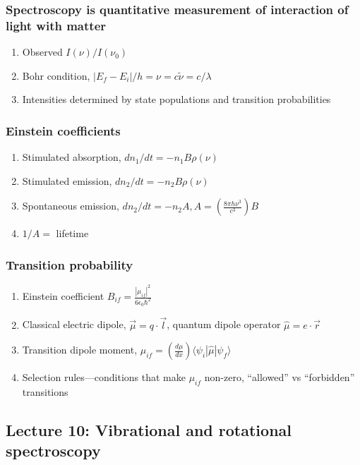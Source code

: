 \documentclass[11pt]{article}
\begin{document}
\subsubsection{Spectroscopy is quantitative measurement of interaction of light with matter}
\label{sec:orga897ceb}
\begin{enumerate}
\item Observed \(I(\nu)/I(\nu_0)\)
\item Bohr condition, \(|E_f-E_i|/h=\nu =c\tilde{\nu}=c/\lambda\)
\item Intensities determined by state populations and transition probabilities
\end{enumerate}
\subsubsection{Einstein coefficients}
\label{sec:org3b58613}
\begin{enumerate}
\item Stimulated absorption, \(dn_1/dt= -n_1 B\rho(\nu)\)
\item Stimulated emission, \(dn_2/dt= -n_2 B\rho(\nu)\)
\item Spontaneous emission, \(dn_2/dt=-n_2 A, A=\left ( \frac{8\pi h
              \nu^3}{c^3}\right )B\)
\item \(1/A=\) lifetime
\end{enumerate}
\subsubsection{Transition probability}
\label{sec:org8d603f5}
\begin{enumerate}
\item Einstein coefficient \(B_{if}=\frac{|\mu_{if}|^2}{6\epsilon_0\hbar^2}\)
\item Classical electric dipole, \(\overrightarrow{\mu}=q \cdot
          \overrightarrow{l}\), quantum dipole operator \(\hat\mu = e\cdot \overrightarrow{r}\)
\item Transition dipole moment, \(\mu_{if} = \left(
        \frac{d\mu}{dx}\right ) \langle \psi_i|\hat\mu |\psi_f \rangle\)
\item Selection rules---conditions that make \(\mu_{if}\) non-zero,
``allowed'' vs ``forbidden'' transitions
\end{enumerate}
\subsection{Lecture 10: Vibrational and rotational spectroscopy}
\label{sec:orgc3feedb}
\end{document}
